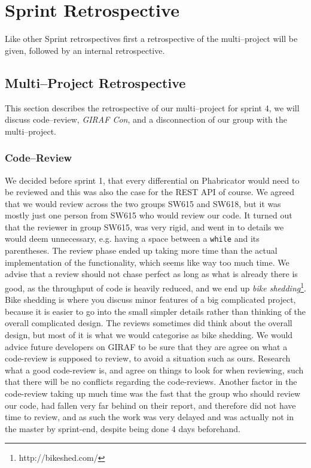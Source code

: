 \section{Sprint Retrospective}
\label{sec:S4retro} %

Like other Sprint retrospectives first a retrospective of the multi--project will be given, followed by an internal retrospective.

\subsection*{Multi--Project Retrospective}
This section describes the retrospective of our multi--project for sprint 4, we will discuss code--review, \textit{GIRAF Con}, and a disconnection of our group with the multi--project.

\subsubsection*{Code--Review}
We decided before sprint 1, that every differential on Phabricator would need to be reviewed and this was also the case for the REST API of course.
We agreed that we would review across the two groups SW615 and SW618, but it was mostly just one person from SW615 who would review our code.
It turned out that the reviewer in group SW615, was very rigid, and went in to details we would deem unnecessary, e.g. having a space between a \texttt{while} and its parentheses.
The review phase ended up taking more time than the actual implementation of the functionality, which seems like way too much time.
We advise that a review should not chase perfect as long as what is already there is good, as the throughput of code is heavily reduced, and we end up \textit{bike shedding}\footnote{http://bikeshed.com/}.
Bike shedding is where you discuss minor features of a big complicated project, because it is easier to go into the small simpler details rather than thinking of the overall complicated design.
The reviews sometimes did think about the overall design, but most of it is what we would categorise as bike shedding.
We would advice future developers on GIRAF to be sure that they are agree on what a code-review is supposed to review, to avoid a situation such as ours.
Research what a good code-review is, and agree on things to look for when reviewing, such that there will be no conflicts regarding the code-reviews.
Another factor in the code-review taking up much time was the fast that the group who should review our code, had fallen very far behind on their report, and therefore did not have time to review, and as such the work was very delayed and was actually not in the master by sprint-end, despite being done 4 days beforehand.


